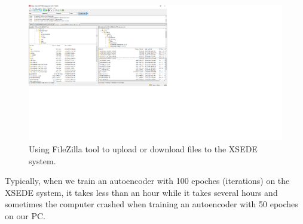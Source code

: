 \documentclass{article}
\begin{document}
\begin{figure}[h!]
	\centering
	\includegraphics[width=1\textwidth]{FileZilla.png}
	\caption{Using FileZilla tool to upload or download files to the XSEDE system.}
	\label{fig:FileZilla}
\end{figure}
Typically, when we train an autoencoder with 100 epoches (iterations) on the XSEDE system, it takes less than an hour while it takes several hours and sometimes the computer crashed when training an autoencoder with 50 epoches on our PC.
\end{document}

